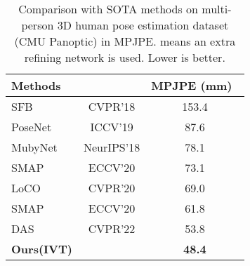\documentclass[sigconf]{acmart}
\begin{document}
\begin{table}[]
\renewcommand\tabcolsep{6pt}
\centering
 \caption{Comparison with SOTA methods on multi-person 3D human pose estimation dataset (CMU Panoptic) in MPJPE.  means an extra refining network is used. Lower is better.}
 \vspace{-0.3cm}
\begin{tabular}{l|c|c}
 \hline
 
 \hline
 Methods &  & MPJPE (mm)~ \\
 \hline
 SFB~\cite{zanfir2018monocular} & CVPR'18 &  153.4\\
 PoseNet~\cite{moon2019camera} & ICCV'19 &  87.6\\
 MubyNet~\cite{zanfir2018deep} & NeurIPS'18  & 78.1\\
 SMAP~\cite{zhen2020smap} & ECCV'20  & 73.1\\
 LoCO~\cite{fabbri2020compressed} & CVPR'20  & 69.0\\
 SMAP~\cite{zhen2020smap} & ECCV'20  & 61.8\\
 DAS~\cite{wang2022distribution} & CVPR'22  & 53.8\\
 \hline
 \textbf{Ours(IVT)} &  & \textbf{48.4}\\

 \hline
 
 \hline
 \end{tabular}
\label{tab_cmu}
\end{table}


\begin{table}[]
\renewcommand\tabcolsep{2pt}
\centering
 \caption{Ablation study of IVT on CMU Panoptic. SA means traditional spatial attention. ISA means using instance-guided spatial attention in IVT. ITA means using instance-guided temporal attention in IVT. CISA represents cross-scale ISA. MITA means multi-scale ITA. Flops are computed on two input images with a size of .}
 \vspace{-0.3cm}
 \label{tab_ab_cmu}
\end{table}
\end{document}

